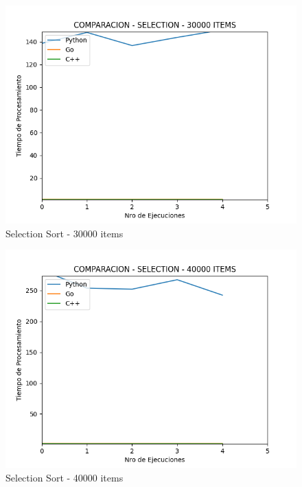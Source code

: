 \documentclass[12pt]{article} %
\begin{document}
    \vspace{5mm}
    
    \begin{figure}[H]
    \centering
    \includegraphics[width=\textwidth]{selection_30000}
    \caption{Selection Sort - 30000 items}
    \end{figure}

    \vspace{5mm}
    
    \begin{figure}[H]
    \centering
    \includegraphics[width=\textwidth]{selection_40000}
    \caption{Selection Sort - 40000 items}
    \end{figure}
\end{document}

